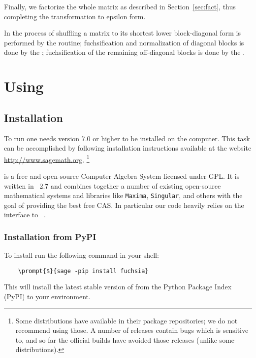\documentclass[12pt,a4paper]{article}
\begin{document}
Finally, we factorize the whole matrix as described in Section~\ref{sec:fact}, thus completing the transformation to epsilon form.

In \fuchsia the process of shuffling a matrix to its shortest lower block-diagonal form is performed by the  routine; fuchsification and normalization of diagonal blocks is done by the ; fuchsification of the remaining off-diagonal blocks is done by the .


\section{Using \fuchsia}
\label{sec:3}

\subsection{Installation}

To run \fuchsia one needs \sage version 7.0 or higher to be installed on the computer.
This task can be accomplished by following installation instructions available at the website \url{http://www.sagemath.org}.
\footnote{
    Some \linux distributions have \sage available in their package repositories; we do not recommend using those.
    A number of \maxima releases contain bugs which \fuchsia is sensitive to, and so far the official \sage builds have avoided those releases (unlike some \linux distributions).
}

\sage is a free and open-source Computer Algebra System licensed under GPL.
It is written in \python~2.7 and combines together a number of existing open-source mathematical systems and libraries like \texttt{Maxima}, \texttt{Singular}, and others with the goal of providing the best free CAS.
In particular our code heavily relies on the interface to \maxima~\cite{maxima}.

\subsubsection{Installation from PyPI}

To install \fuchsia run the following command in your shell:

\begin{Verbatim}
    \prompt{$}{sage -pip install fuchsia}
\end{Verbatim}

This will install the latest stable version of \fuchsia from the Python Package Index (PyPI) to your \sage environment.
\end{document}
